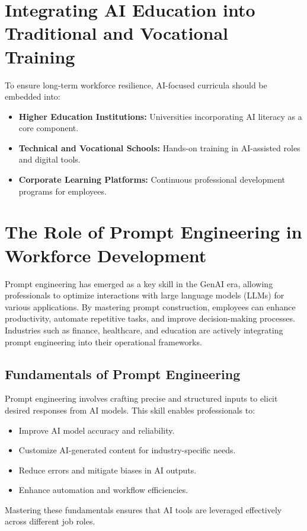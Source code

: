 \documentclass[a4paper,headinclude=on,footinclude=on,12pt,oneside]{scrbook}
\begin{document}
\section{Integrating AI Education into Traditional and Vocational Training}

To ensure long-term workforce resilience, AI-focused curricula should be embedded into:
\begin{itemize}
	\item \textbf{Higher Education Institutions:} Universities incorporating AI literacy as a core component.
	\item \textbf{Technical and Vocational Schools:} Hands-on training in AI-assisted roles and digital tools.
	\item \textbf{Corporate Learning Platforms:} Continuous professional development programs for employees.
\end{itemize}

\section{The Role of Prompt Engineering in Workforce Development}
Prompt engineering has emerged as a key skill in the GenAI era, allowing professionals to optimize interactions with large language models (LLMs) for various applications. By mastering prompt construction, employees can enhance productivity, automate repetitive tasks, and improve decision-making processes. Industries such as finance, healthcare, and education are actively integrating prompt engineering into their operational frameworks.

\subsection{Fundamentals of Prompt Engineering}
Prompt engineering involves crafting precise and structured inputs to elicit desired responses from AI models. This skill enables professionals to:
\begin{itemize}
	\item Improve AI model accuracy and reliability.
	\item Customize AI-generated content for industry-specific needs.
	\item Reduce errors and mitigate biases in AI outputs.
	\item Enhance automation and workflow efficiencies.
\end{itemize}
Mastering these fundamentals ensures that AI tools are leveraged effectively across different job roles.
\end{document}
